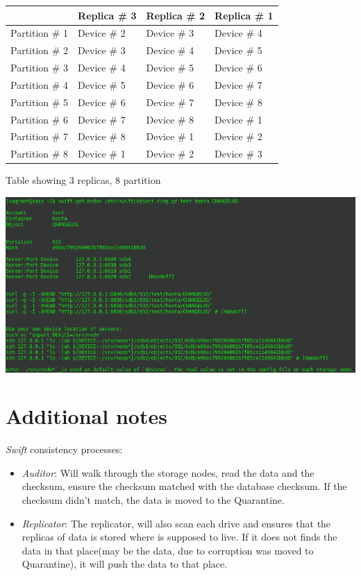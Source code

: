 \documentclass{article}
\begin{document}
\begin{center}
\begin{tabular}{llll}
 & Replica \# 3 & Replica \# 2 & Replica \# 1\\
\hline
Partition \# 1 & Device \# 2 & Device \# 3 & Device \# 4\\
Partition \# 2 & Device \# 3 & Device \# 4 & Device \# 5\\
Partition \# 3 & Device \# 4 & Device \# 5 & Device \# 6\\
Partition \# 4 & Device \# 5 & Device \# 6 & Device \# 7\\
Partition \# 5 & Device \# 6 & Device \# 7 & Device \# 8\\
Partition \# 6 & Device \# 7 & Device \# 8 & Device \# 1\\
Partition \# 7 & Device \# 8 & Device \# 1 & Device \# 2\\
Partition \# 8 & Device \# 1 & Device \# 2 & Device \# 3\\
\end{tabular}
\end{center}


Table showing 3 replicas, 8 partition
\begin{center}
\includegraphics[width=.9\linewidth]{./img/swift-get-nodes.png}
\end{center}

\section{Additional notes}
\label{sec:org94d8e65}
\emph{Swift} consistency processes:
\begin{itemize}
\item \emph{Auditor}: Will walk through the storage nodes, read the data and
the checksum, ensure the checksum matched with the database
checksum. If the checksum didn't match, the data is moved to the
Quarantine.
\item \emph{Replicator}: The replicator, will also scan each drive and
ensures that the replicas of data is stored where is supposed to
live. If it does not finds the data in that place(may be the
data, due to corruption was moved to Quarantine), it will push
the data to that place.
\end{itemize}
\end{document}
